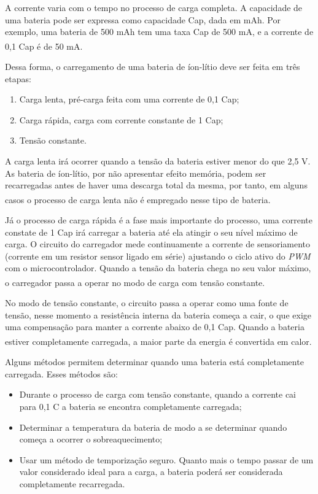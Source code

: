 \documentclass[
	12pt,				%
	openright,			%
	oneside,			%
	a4paper,			%
	english,			%
	french,				%
	spanish,			%
	brazil,				%
	oldfontcommands
	]{abntex2}
\begin{document}
	A corrente varia com o tempo no processo de carga completa. A capacidade de uma bateria pode ser expressa como capacidade Cap, dada em mAh. Por exemplo, uma bateria de 500 mAh tem uma taxa Cap de 500 mA, e a corrente de 0,1 Cap é de 50 mA.\textsuperscript{\cite{carregador}}
	
	Dessa forma, o carregamento de uma bateria de íon-lítio deve ser feita em três etapas:
	
	\begin{enumerate}
		\item Carga lenta, pré-carga feita com uma corrente de 0,1 Cap;
		\item Carga rápida, carga com corrente constante de 1 Cap;
		\item Tensão constante.
	\end{enumerate}
	
	A carga lenta irá ocorrer quando a tensão da bateria estiver menor do que 2,5 V. As bateria de íon-lítio, por não apresentar efeito memória, podem ser recarregadas antes de haver uma descarga total da mesma, por tanto, em alguns casos o processo de carga lenta não é empregado nesse tipo de bateria.\textsuperscript{\cite{carregador}}
	
	Já o processo de carga rápida é a fase mais importante do processo, uma corrente constate de 1 Cap irá carregar a bateria até ela atingir o seu nível máximo de carga. O circuito do carregador mede continuamente a corrente de sensoriamento (corrente em um resistor sensor ligado em série) ajustando o ciclo ativo do \textit{PWM} com o microcontrolador. Quando a tensão da bateria chega no seu valor máximo, o carregador passa a operar no modo de carga com tensão constante.\textsuperscript{\cite{carregador}}
	
	No modo de tensão constante, o circuito passa a operar como uma fonte de tensão, nesse momento a resistência interna da bateria começa a cair, o que exige uma compensação para manter a corrente abaixo de 0,1 Cap. Quando a bateria estiver completamente carregada, a maior parte da energia é convertida em calor.\textsuperscript{\cite{carregador}}

	Alguns métodos permitem determinar quando uma bateria está completamente carregada. Esses métodos são:
	
	\begin{itemize}
		\item Durante o processo de carga com tensão constante, quando a corrente cai para 0,1 C a bateria se encontra completamente carregada;
		\item Determinar a temperatura da bateria de modo a se determinar quando começa a ocorrer o sobreaquecimento;
		\item Usar um método de temporização seguro. Quanto mais o tempo passar de um valor considerado ideal para a carga, a bateria poderá ser considerada completamente recarregada.
	\end{itemize}
\end{document}
